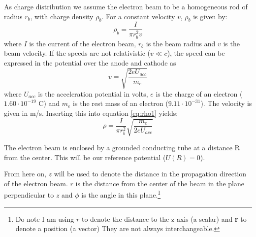As charge distribution we assume the electron beam to be a homogeneous rod of radius $r_b$, with charge density $\rho_b$. For a constant velocity $v$, $\rho_b$ is given by:
\begin{equation}
\label{eq:rho1}
\rho_b = \frac{I}{\pi r_b^2v}
\end{equation}
where $I$ is the current of the electron beam, $r_b$ is the beam radius and $v$ is the beam velocity.
If the speeds are not relativistic ($v\ll c$), the speed can be expressed in the potential over the anode and cathode as
\begin{displaymath}
v = \sqrt{\frac{2eU_{acc}}{m_e}}
\end{displaymath}
where $U_{acc}$ is the acceleration potential in volts, $e$ is the charge of an electron ($1.60\cdot10^{-19}$ C) and $m_e$ is the rest mass of an electron ($9.11\cdot 10^{-31}$). The velocity is given in m/s. Inserting this into equation \ref{eq:rho1} yields:
\begin{equation}
\rho = \frac{I}{\pi r_b^2} \sqrt{\frac{m_e}{2eU_{acc}}}
\end{equation}

The electron beam is enclosed by a grounded conducting tube at a distance R from the center. This will be our reference potential ($U(R) = 0$).

From here on, $z$ will be used to denote the distance in the propagation direction of the electron beam. $r$ is the distance from the center of the beam in the plane perpendicular to $z$ and $\phi$ is the angle in this plane.\footnote{Do note I am using $r$ to denote the distance to the z-axis (a scalar) and \textbf{r} to denote a position (a vector) They are not always interchangeable.}

